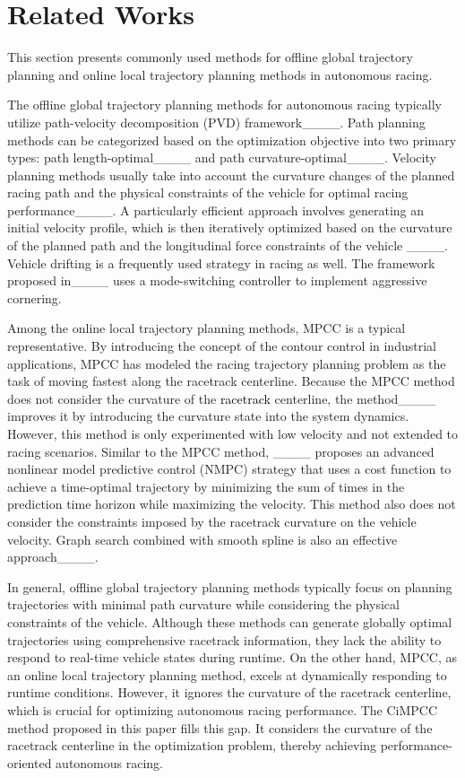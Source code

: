 \section{Related Works}
\label{Related_Works}

This section presents commonly used methods for offline global trajectory planning and online local trajectory planning methods in autonomous racing.

The offline global trajectory planning methods for autonomous racing typically utilize path-velocity decomposition (PVD)  framework____. Path planning methods can be categorized based on the optimization objective into two primary types: path length-optimal____ and path curvature-optimal____. Velocity planning methods usually take into account the curvature changes of the planned racing path and the physical constraints of the vehicle for optimal racing performance____. A particularly efficient approach involves generating an initial velocity profile, which is then iteratively optimized based on the curvature of the planned path and the longitudinal force constraints of the vehicle ____. Vehicle drifting is a frequently used strategy in racing as well. The framework proposed in____ uses a mode-switching  controller to implement aggressive cornering.
	
Among the online local trajectory planning methods, MPCC is a typical representative. By introducing the concept of the contour control in industrial applications, MPCC has modeled the racing trajectory planning problem as the task of moving fastest along the racetrack centerline. Because the MPCC method does not consider the curvature of the \textcolor{black}{racetrack} centerline, the method____  improves it by introducing the curvature state into the system dynamics. However, this method is only experimented with low velocity and not extended to racing scenarios. Similar to the MPCC method, ____ proposes an advanced nonlinear model predictive control (NMPC) strategy that uses a cost function to achieve a time-optimal trajectory by minimizing the sum of times in the prediction time horizon while maximizing the velocity. This method also does not consider the constraints imposed by the racetrack curvature on the vehicle velocity. Graph search combined with smooth spline is also an effective approach____.

In general, offline global trajectory planning methods typically focus on planning trajectories with minimal path curvature while considering the physical constraints of the vehicle. Although these methods can generate globally optimal trajectories using comprehensive racetrack information, they lack the ability to respond to real-time vehicle states during runtime. On the other hand, MPCC, as an online local trajectory planning method, excels at dynamically responding to runtime conditions. However, it ignores the curvature of the racetrack centerline, which is crucial for optimizing autonomous racing performance. The CiMPCC method proposed in this paper fills this gap. It considers the curvature of the racetrack centerline in the optimization problem, thereby achieving performance-oriented autonomous racing.



